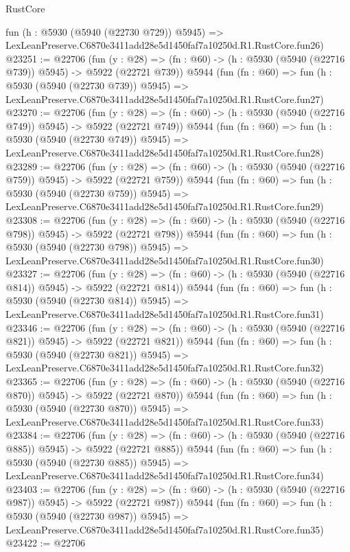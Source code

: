 \begin{lexlean}{RustCore}
\begin{coremodule}
    fun (h : @5930 (@5940 (@22730 @729)) @5945) =>
    LexLeanPreserve.C6870e3411add28e5d1450faf7a10250d.R1.RustCore.fun26)
@23251 := @22706
    (fun (y : @28) => (fn : @60) -> (h : @5930 (@5940 (@22716 @739)) @5945) -> @5922 (@22721 @739))
    @5944
    (fun (fn : @60) =>
    fun (h : @5930 (@5940 (@22730 @739)) @5945) =>
    LexLeanPreserve.C6870e3411add28e5d1450faf7a10250d.R1.RustCore.fun27)
@23270 := @22706
    (fun (y : @28) => (fn : @60) -> (h : @5930 (@5940 (@22716 @749)) @5945) -> @5922 (@22721 @749))
    @5944
    (fun (fn : @60) =>
    fun (h : @5930 (@5940 (@22730 @749)) @5945) =>
    LexLeanPreserve.C6870e3411add28e5d1450faf7a10250d.R1.RustCore.fun28)
@23289 := @22706
    (fun (y : @28) => (fn : @60) -> (h : @5930 (@5940 (@22716 @759)) @5945) -> @5922 (@22721 @759))
    @5944
    (fun (fn : @60) =>
    fun (h : @5930 (@5940 (@22730 @759)) @5945) =>
    LexLeanPreserve.C6870e3411add28e5d1450faf7a10250d.R1.RustCore.fun29)
@23308 := @22706
    (fun (y : @28) => (fn : @60) -> (h : @5930 (@5940 (@22716 @798)) @5945) -> @5922 (@22721 @798))
    @5944
    (fun (fn : @60) =>
    fun (h : @5930 (@5940 (@22730 @798)) @5945) =>
    LexLeanPreserve.C6870e3411add28e5d1450faf7a10250d.R1.RustCore.fun30)
@23327 := @22706
    (fun (y : @28) => (fn : @60) -> (h : @5930 (@5940 (@22716 @814)) @5945) -> @5922 (@22721 @814))
    @5944
    (fun (fn : @60) =>
    fun (h : @5930 (@5940 (@22730 @814)) @5945) =>
    LexLeanPreserve.C6870e3411add28e5d1450faf7a10250d.R1.RustCore.fun31)
@23346 := @22706
    (fun (y : @28) => (fn : @60) -> (h : @5930 (@5940 (@22716 @821)) @5945) -> @5922 (@22721 @821))
    @5944
    (fun (fn : @60) =>
    fun (h : @5930 (@5940 (@22730 @821)) @5945) =>
    LexLeanPreserve.C6870e3411add28e5d1450faf7a10250d.R1.RustCore.fun32)
@23365 := @22706
    (fun (y : @28) => (fn : @60) -> (h : @5930 (@5940 (@22716 @870)) @5945) -> @5922 (@22721 @870))
    @5944
    (fun (fn : @60) =>
    fun (h : @5930 (@5940 (@22730 @870)) @5945) =>
    LexLeanPreserve.C6870e3411add28e5d1450faf7a10250d.R1.RustCore.fun33)
@23384 := @22706
    (fun (y : @28) => (fn : @60) -> (h : @5930 (@5940 (@22716 @885)) @5945) -> @5922 (@22721 @885))
    @5944
    (fun (fn : @60) =>
    fun (h : @5930 (@5940 (@22730 @885)) @5945) =>
    LexLeanPreserve.C6870e3411add28e5d1450faf7a10250d.R1.RustCore.fun34)
@23403 := @22706
    (fun (y : @28) => (fn : @60) -> (h : @5930 (@5940 (@22716 @987)) @5945) -> @5922 (@22721 @987))
    @5944
    (fun (fn : @60) =>
    fun (h : @5930 (@5940 (@22730 @987)) @5945) =>
    LexLeanPreserve.C6870e3411add28e5d1450faf7a10250d.R1.RustCore.fun35)
@23422 := @22706

\end{coremodule}
\end{lexlean}
